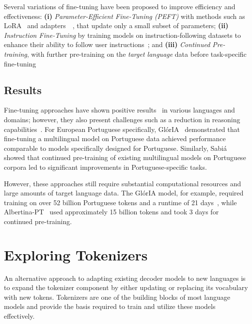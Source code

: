 Several variations of fine-tuning have been proposed to improve efficiency and effectiveness: \textbf{(i)} \textit{Parameter-Efficient Fine-Tuning (PEFT)} with methods such as LoRA~\cite{hu2022lora} and adapters~\cite{houlsby2019parameter}~\cite{hu2023llm}, that update only a small subset of parameters; \textbf{(ii)} \textit{Instruction Fine-Tuning} by training models on instruction-following datasets to enhance their ability to follow user instructions~\cite{wei2021finetuned}; and \textbf{(iii)} \textit{Continued Pre-training}, with further pre-training on the \emph{target language} data before task-specific fine-tuning~\cite{gururangan2020don}


\subsection{Results}
Fine-tuning approaches have shown positive results~\cite{xia2024understanding} in various languages and domains; however, they also present challenges such as a reduction in reasoning capabilities~\cite{khade2024challenges}. For European Portuguese specifically, GlórIA~\cite{lopes2024gloriagenerativeopen} demonstrated that fine-tuning a multilingual model on Portuguese data achieved performance comparable to models specifically designed for Portuguese. Similarly, Sabiá~\cite{10.1007/978-3-031-45392-2_15} showed that continued pre-training of existing multilingual models on Portuguese corpora led to significant improvements in Portuguese-specific tasks.

However, these approaches still require substantial computational resources and large amounts of target language data. The GlórIA model, for example, required training on over 52 billion Portuguese tokens and a runtime of 21 days~\cite{lopes2024gloriagenerativeopen}, while Albertina-PT~\cite{rodrigues2023advancing} used approximately 15 billion tokens and took 3 days for continued pre-training.

\section{Exploring Tokenizers}\label{Section3.2}
An alternative approach to adapting existing decoder models to new languages is to expand the tokenizer component \cite{kim2024efficient, nakash2025adaptivocab} by either updating or replacing its vocabulary with new tokens. Tokenizers are one of the building blocks of most language models and provide the basis required to train and utilize these models effectively.

